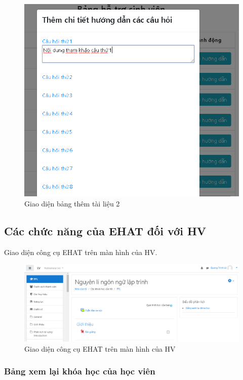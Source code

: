 \begin{center}
	\begin{figure}[htp]
		\begin{center}
			\includegraphics[width=0.6\linewidth]{img/31}
		\end{center}
		\caption{Giao diện bảng thêm tài liệu 2}
		\label{refhinh63}
	\end{figure}
\end{center}

\newpage
\subsection*{Các chức năng của EHAT đối với HV}

Giao diện công cụ EHAT trên màn hình của HV.

\begin{center}
	\begin{figure}[htp]
		\begin{center}
			\includegraphics[width=1\linewidth]{img/32}
		\end{center}
		\caption{Giao diện công cụ EHAT trên màn hình của HV}
		\label{refhinh64}
	\end{figure}
\end{center}

\newpage
\subsubsection*{Bảng xem lại khóa học của học viên}

